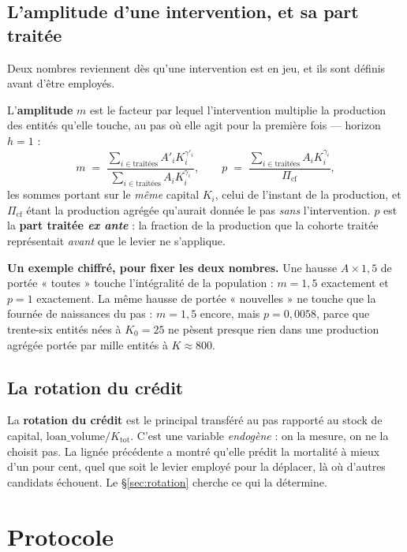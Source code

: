 \documentclass[11pt,a4paper]{article}
\begin{document}
\subsection{L'amplitude d'une intervention, et sa part traitée}

Deux nombres reviennent dès qu'une intervention est en jeu, et ils sont
définis avant d'être employés.

L'\textbf{amplitude} $m$ est le facteur par lequel l'intervention multiplie la
production des entités qu'elle touche, au pas où elle agit pour la première
fois --- horizon $h = 1$ :
\begin{equation}
m \;=\;
\frac{\sum_{i \in \text{traitées}} A'_i K_i^{\gamma'_i}}
     {\sum_{i \in \text{traitées}} A_i K_i^{\gamma_i}},
\qquad
p \;=\;
\frac{\sum_{i \in \text{traitées}} A_i K_i^{\gamma_i}}
     {\Pi_{\text{cf}}},
\label{eq:mp}
\end{equation}
les sommes portant sur le \emph{même} capital $K_i$, celui de l'instant de la
production, et $\Pi_{\text{cf}}$ étant la production agrégée qu'aurait donnée
le pas \emph{sans} l'intervention. $p$ est la \textbf{part traitée
\emph{ex ante}} : la fraction de la production que la cohorte traitée
représentait \emph{avant} que le levier ne s'applique.

\textbf{Un exemple chiffré, pour fixer les deux nombres.} Une hausse
$A \times 1{,}5$ de portée « toutes » touche l'intégralité de la population :
$m = 1{,}5$ exactement et $p = 1$ exactement. La même hausse de portée
« nouvelles » ne touche que la fournée de naissances du pas : $m = 1{,}5$
encore, mais $p = 0{,}0058$, parce que trente-six entités nées à $K_0 = 25$ ne
pèsent presque rien dans une production agrégée portée par mille entités à
$K \approx 800$.

\subsection{La rotation du crédit}

La \textbf{rotation du crédit} est le principal transféré au pas rapporté au
stock de capital, $\text{loan\_volume}/K_{\text{tot}}$. C'est une variable
\emph{endogène} : on la mesure, on ne la choisit pas. La lignée précédente a
montré qu'elle prédit la mortalité à mieux d'un pour cent, quel que soit le
levier employé pour la déplacer, là où d'autres candidats échouent. Le
§\ref{sec:rotation} cherche ce qui la détermine.

\section{Protocole}
\label{sec:protocole}
\end{document}
